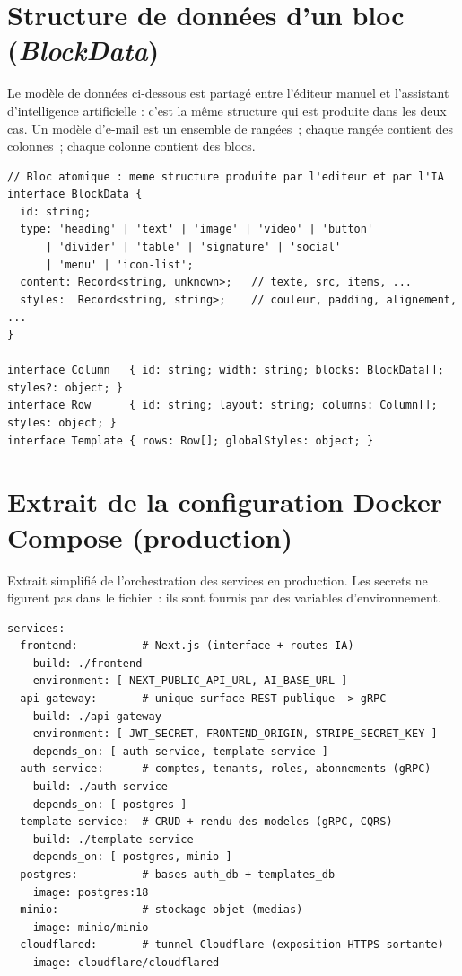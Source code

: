\documentclass[12pt,a4paper,oneside]{report}
\begin{document}
\appendix
\cleardoublepage

\chapter{Structure de données d'un bloc (\emph{BlockData})}
\label{annexe:blockdata}
Le modèle de données ci-dessous est partagé entre l'éditeur manuel et
l'assistant d'intelligence artificielle : c'est la même structure qui est
produite dans les deux cas. Un modèle d'e-mail est un ensemble de rangées~;
chaque rangée contient des colonnes~; chaque colonne contient des blocs.

\begin{lstlisting}
// Bloc atomique : meme structure produite par l'editeur et par l'IA
interface BlockData {
  id: string;
  type: 'heading' | 'text' | 'image' | 'video' | 'button'
      | 'divider' | 'table' | 'signature' | 'social'
      | 'menu' | 'icon-list';
  content: Record<string, unknown>;   // texte, src, items, ...
  styles:  Record<string, string>;    // couleur, padding, alignement, ...
}

interface Column   { id: string; width: string; blocks: BlockData[]; styles?: object; }
interface Row      { id: string; layout: string; columns: Column[]; styles: object; }
interface Template { rows: Row[]; globalStyles: object; }
\end{lstlisting}

\chapter{Extrait de la configuration Docker Compose (production)}
\label{annexe:compose}
Extrait simplifié de l'orchestration des services en production. Les
secrets ne figurent pas dans le fichier~: ils sont fournis par des
variables d'environnement.

\begin{lstlisting}
services:
  frontend:          # Next.js (interface + routes IA)
    build: ./frontend
    environment: [ NEXT_PUBLIC_API_URL, AI_BASE_URL ]
  api-gateway:       # unique surface REST publique -> gRPC
    build: ./api-gateway
    environment: [ JWT_SECRET, FRONTEND_ORIGIN, STRIPE_SECRET_KEY ]
    depends_on: [ auth-service, template-service ]
  auth-service:      # comptes, tenants, roles, abonnements (gRPC)
    build: ./auth-service
    depends_on: [ postgres ]
  template-service:  # CRUD + rendu des modeles (gRPC, CQRS)
    build: ./template-service
    depends_on: [ postgres, minio ]
  postgres:          # bases auth_db + templates_db
    image: postgres:18
  minio:             # stockage objet (medias)
    image: minio/minio
  cloudflared:       # tunnel Cloudflare (exposition HTTPS sortante)
    image: cloudflare/cloudflared
\end{lstlisting}
\end{document}
